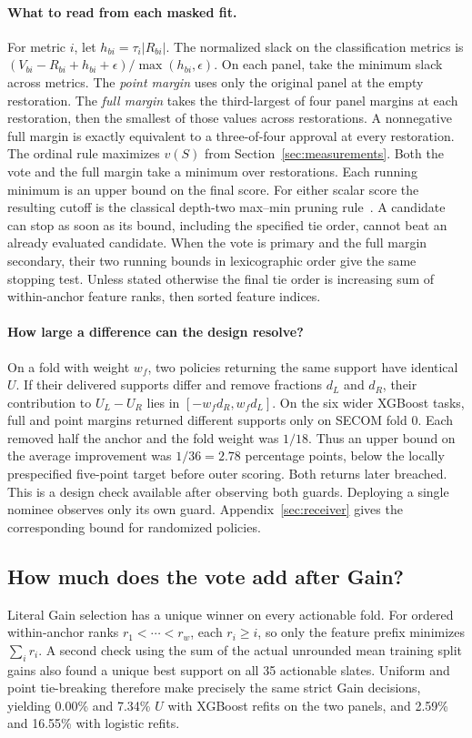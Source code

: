 \paragraph{What to read from each masked fit.}
For metric $i$, let $h_{bi}=\tau_i|R_{bi}|$. The normalized slack on the classification metrics is $(V_{bi}-R_{bi}+h_{bi}+\epsilon)/\max(h_{bi},\epsilon)$. On each panel, take the minimum slack across metrics. The \emph{point margin} uses only the original panel at the empty restoration. The \emph{full margin} takes the third-largest of four panel margins at each restoration, then the smallest of those values across restorations. A nonnegative full margin is exactly equivalent to a three-of-four approval at every restoration. The ordinal rule maximizes $v(S)$ from Section~\ref{sec:measurements}. Both the vote and the full margin take a minimum over restorations. Each running minimum is an upper bound on the final score. For either scalar score the resulting cutoff is the classical depth-two max--min pruning rule~\cite{knuth1975alphabeta}. A candidate can stop as soon as its bound, including the specified tie order, cannot beat an already evaluated candidate. When the vote is primary and the full margin secondary, their two running bounds in lexicographic order give the same stopping test. Unless stated otherwise the final tie order is increasing sum of within-anchor feature ranks, then sorted feature indices.

\paragraph{How large a difference can the design resolve?}
On a fold with weight $w_f$, two policies returning the same support have identical $U$. If their delivered supports differ and remove fractions $d_L$ and $d_R$, their contribution to $U_L-U_R$ lies in $[-w_fd_R,w_fd_L]$. On the six wider XGBoost tasks, full and point margins returned different supports only on SECOM fold 0. Each removed half the anchor and the fold weight was $1/18$. Thus an upper bound on the average improvement was $1/36=2.78$ percentage points, below the locally prespecified five-point target before outer scoring. Both returns later breached. This is a design check available after observing both guards. Deploying a single nominee observes only its own guard. Appendix~\ref{sec:receiver} gives the corresponding bound for randomized policies.



\subsection{How much does the vote add after Gain?}
Literal Gain selection has a unique winner on every actionable fold. For ordered within-anchor ranks $r_1<\cdots<r_w$, each $r_i\ge i$, so only the feature prefix minimizes $\sum_i r_i$. A second check using the sum of the actual unrounded mean training split gains also found a unique best support on all 35 actionable slates. Uniform and point tie-breaking therefore make precisely the same strict Gain decisions, yielding 0.00\% and 7.34\% $U$ with XGBoost refits on the two panels, and 2.59\% and 16.55\% with logistic refits.

